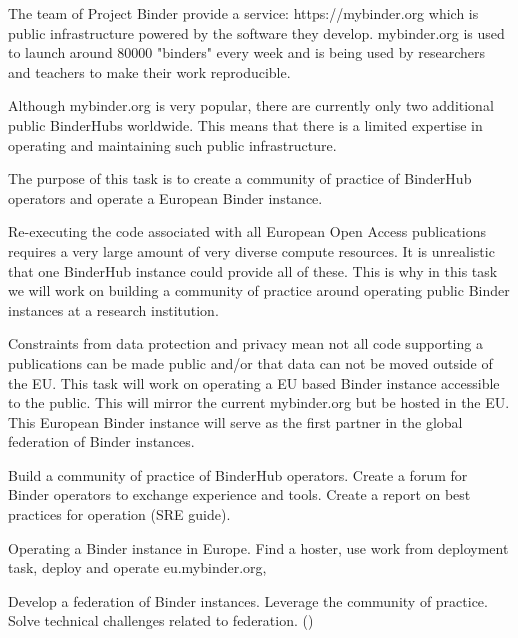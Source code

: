 \begin{task}[
  title=Prototype European Binder instance and global federation,
  id=eu-binder,
  lead=SRL,
  PM=25,
  wphases={0-48},
  partners={SRL,EGI,WTT,UPSUD}
]
  The team of Project Binder provide a service: https://mybinder.org
  which is public infrastructure powered by the software they develop.
  mybinder.org is used to launch around 80000 "binders" every week and is
  being used by researchers and teachers to make their work reproducible.

  Although mybinder.org is very popular, there are currently only two
  additional public BinderHubs worldwide. This means that there is a limited
  expertise in operating and maintaining such public infrastructure.

  The purpose of this task is to create a community of practice of BinderHub
  operators and operate a European Binder instance.

  Re-executing the code associated with all European Open Access publications
  requires a very large amount of very diverse compute resources. It is
  unrealistic that one BinderHub instance could provide all of these. This is
  why in this task we will work on building a community of practice around
  operating public Binder instances at a research institution.

  Constraints from data protection and privacy mean not all code supporting a
  publications can be made public and/or that data can not be moved outside of
  the EU. This task will work on operating a EU based Binder instance accessible
  to the public. This will mirror the current mybinder.org but be hosted in
  the EU. This European Binder instance will serve as the first partner in the
  global federation of Binder instances.




  \begin{compactitem}
  \item Build a community of practice of BinderHub operators. Create a forum
  for Binder operators to exchange experience and tools. Create a report on
  best practices for operation (SRE guide).
  \item Operating a Binder instance in Europe. Find a hoster, use work from
  deployment task, deploy and operate eu.mybinder.org, 
  \item Develop a federation of Binder instances. Leverage the community of
  practice. Solve technical challenges related to federation.
    ()
  \end{compactitem}
\end{task}
